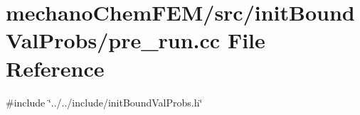 \section{mechano\+Chem\+F\+E\+M/src/init\+Bound\+Val\+Probs/pre\+\_\+run.cc File Reference}
\label{pre__run_8cc}
{\ttfamily \#include \char`\"{}../../include/init\+Bound\+Val\+Probs.\+h\char`\"{}}\newline
